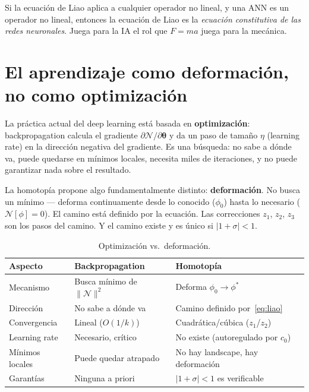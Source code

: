 \documentclass[11pt,a4paper]{article}
\begin{document}
\begin{resultado}
Si la ecuaci\'on de Liao aplica a cualquier operador no lineal, y una ANN es un operador no lineal, entonces la ecuaci\'on de Liao es la \emph{ecuaci\'on constitutiva de las redes neuronales}. Juega para la IA el rol que $F=ma$ juega para la mec\'anica.
\end{resultado}


\section{El aprendizaje como deformaci\'on, no como optimizaci\'on}

La pr\'actica actual del deep learning est\'a basada en \textbf{optimizaci\'on}: backpropagation calcula el gradiente $\partial\mathcal{N}/\partial\boldsymbol{\theta}$ y da un paso de tama\~no $\eta$ (learning rate) en la direcci\'on negativa del gradiente. Es una b\'usqueda: no sabe a d\'onde va, puede quedarse en m\'inimos locales, necesita miles de iteraciones, y no puede garantizar nada sobre el resultado.

La homotop\'ia propone algo fundamentalmente distinto: \textbf{deformaci\'on}. No busca un m\'inimo --- deforma continuamente desde lo conocido ($\phi_0$) hasta lo necesario ($\mathcal{N}[\phi] = 0$). El camino est\'a definido por la ecuaci\'on. Las correcciones $z_1$, $z_2$, $z_3$ son los pasos del camino. Y el camino existe y es \'unico si $|1+\sigma| < 1$.

\begin{table}[H]
\centering
\caption{Optimizaci\'on vs.\ deformaci\'on.}
\begin{tabular}{L{4cm} L{5.5cm} L{5.5cm}}
\toprule
\textbf{Aspecto} & \textbf{Backpropagation} & \textbf{Homotop\'ia} \\
\midrule
Mecanismo & Busca m\'inimo de $\|\mathcal{N}\|^2$ & Deforma $\phi_0 \to \phi^*$ \\
Direcci\'on & No sabe a d\'onde va & Camino definido por~\eqref{eq:liao} \\
Convergencia & Lineal ($O(1/k)$) & Cuadr\'atica/c\'ubica ($z_1$/$z_2$) \\
Learning rate & Necesario, cr\'itico & No existe (autoregulado por $c_0$) \\
M\'inimos locales & Puede quedar atrapado & No hay landscape, hay deformaci\'on \\
Garant\'ias & Ninguna a priori & $|1+\sigma|<1$ es verificable \\
\bottomrule
\end{tabular}
\end{table}
\end{document}
